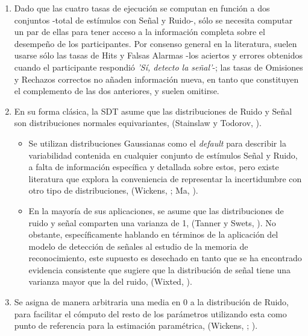 \begin{enumerate}

\item  Dado que las cuatro tasas de ejecución se computan en función a dos conjuntos -total de estímulos con Señal y Ruido-, sólo se necesita computar un par de ellas para tener acceso a la información completa sobre el desempeño de los participantes. Por consenso general en la literatura, suelen usarse sólo las tasas de Hits y Falsas Alarmas -los aciertos y errores obtenidos cuando el participante respondió \textit{'Sí, detecto la señal'}-; las tasas de Omisiones y Rechazos correctos no añaden información nueva, en tanto que constituyen el complemento de las dos anteriores, y suelen omitirse.\\

\item En su forma clásica, la SDT asume que las distribuciones de Ruido y Señal son distribuciones normales equivariantes, (Stainslaw y Todorov, \citeyear{Stainslaw1999}).\\
  \begin{itemize}
  \item Se utilizan distribuciones Gaussianas como el \textit{default} para describir la variabilidad contenida en cualquier conjunto de estímulos Señal y Ruido, a falta de información específica y detallada sobre estos, pero existe literatura que explora la conveniencia de representar la incertidumbre con otro tipo de distribuciones, (Wickens, \citeyear{Wickens1}; Ma, \citeyear{WeijiMa2009}).\\
  \item En la mayoría de sus aplicaciones, se asume que las distribuciones de ruido y señal comparten una varianza de 1, (Tanner y Swets, \citeyear{Tanner1954}). No obstante, específicamente hablando en términos de la aplicación del modelo de detección de señales al estudio de la memoria de reconocimiento, este supuesto es desechado en tanto que se ha encontrado evidencia consistente que sugiere que la distribución de señal tiene una varianza mayor que la del ruido, (Wixted, \citeyear{Wixted2007}).\\
  \end{itemize}

\item Se asigna de manera arbitraria una media en 0 a la distribución de Ruido, para facilitar el cómputo del resto de los parámetros utilizando esta  como punto de referencia para la estimación paramétrica, (Wickens, \citeyear{Wickens1}; \citeyear{Gescheider}).\\


\end{enumerate}
